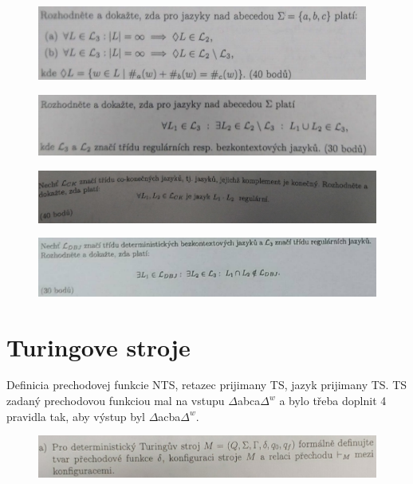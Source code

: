 \documentclass[]{article}
\begin{document}
	\begin{figure}[H]
		\includegraphics[width=\textwidth]{tasks/vlastnosti/task3.png}
	\end{figure}


	\begin{figure}[H]
		\includegraphics[width=\textwidth]{tasks/vlastnosti/task4.png}
	\end{figure}
	
	\begin{figure}[H]
		\includegraphics[width=\textwidth]{tasks/vlastnosti/task5.png}
	\end{figure}

	\begin{figure}[H]
		\includegraphics[width=\textwidth]{tasks/vlastnosti/task6.png}
	\end{figure}

	\section{Turingove stroje}
	
	Definicia prechodovej funkcie NTS, retazec prijimany TS, jazyk prijimany TS. TS zadaný prechodovou funkciou mal na vstupu $\Delta$abca$\Delta^{w}$ a bylo třeba doplnit 4 pravidla tak, aby výstup byl $\Delta$acba$\Delta^{w}$.
	
	\begin{figure}[H]
		\includegraphics[width=\textwidth]{tasks/ts/task1.png}
	\end{figure}
\end{document}
